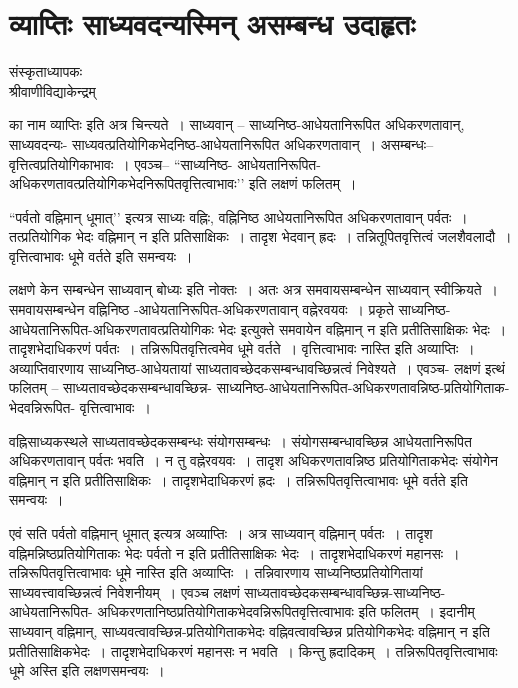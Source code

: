 {\fontsize{15}{17}\selectfont
\chapter{व्याप्तिः साध्यवदन्यस्मिन्  असम्बन्ध उदाहृतः}

\begin{center}
\smallskip

संस्कृताध्यापकः\\
श्रीवाणीविद्याकेन्द्रम्
\addrule
\end{center}

का नाम व्याप्तिः इति अत्र चिन्त्यते~। साध्यवान् – साध्यनिष्ठ-आधेयतानिरूपित अधिकरणतावान्, साध्यवदन्यः- साध्यवत्प्रतियोगिकभेदनिष्ठ-आधेयतानिरूपित अधिकरणतावान्~। असम्बन्धः--वृत्तित्वप्रतियोगिकाभावः~। एवञ्च– “साध्यनिष्ठ- आधेयतानिरूपित-अधिकरणतावत्प्रतियोगिकभेदनिरूपितवृत्तित्वाभावः’’ इति लक्षणं फलितम्~। 

“पर्वतो वह्निमान् धूमात्’’ इत्यत्र साध्यः वह्निः, वह्निनिष्ठ आधेयतानिरूपित अधिकरणतावान् पर्वतः~। तत्प्रतियोगिक भेदः वह्निमान् न इति प्रतिसाक्षिकः~। तादृश भेदवान् ह्रदः~। तन्नितूपितवृत्तित्वं जलशैवलादौ~। वृत्तित्वाभावः धूमे वर्तते इति समन्वयः~। 

लक्षणे केन सम्बन्धेन साध्यवान् बोध्यः इति नोक्तः~। अतः अत्र समवायसम्बन्धेन साध्यवान् स्वीक्रियते~। समवायसम्बन्धेन वह्निनिष्ठ -आधेयतानिरूपित-अधिकरणतावान् वह्नेरवयवः~। प्रकृते साध्यनिष्ठ-आधेयतानिरूपित-अधिकरणतावत्प्रतियोगिकः भेदः इत्युक्ते समवायेन वह्निमान् न इति प्रतीतिसाक्षिकः भेदः~। तादृशभेदाधिकरणं पर्वतः~। तन्निरूपितवृत्तित्वमेव धूमे वर्तते~। वृत्तित्वाभावः नास्ति इति अव्याप्तिः~। अव्याप्तिवारणाय साध्यनिष्ठ-आधेयतायां साध्यतावच्छेदकसम्बन्धावच्छिन्नत्वं निवेश्यते~। एवञ्च- लक्षणं इत्थं फलितम् – साध्यतावच्छेदकसम्बन्धावच्छिन्न- साध्यनिष्ठ-आधेयतानिरूपित-अधिकरणतावन्निष्ठ-प्रतियोगिताक-भेदवन्निरूपित- वृत्तित्वाभावः~। 

वह्निसाध्यकस्थले साध्यतावच्छेदकसम्बन्धः संयोगसम्बन्धः~। संयोगसम्बन्धावच्छिन्न आधेयतानिरूपित अधिकरणतावान् पर्वतः भवति~। न तु वह्नेरवयवः~। तादृश अधिकरणतावन्निष्ठ प्रतियोगिताकभेदः संयोगेन वह्निमान् न इति प्रतीतिसाक्षिकः~। तादृशभेदाधिकरणं ह्रदः~। तन्निरूपितवृत्तित्वाभावः धूमे वर्तते इति समन्वयः~। 

एवं सति पर्वतो वह्निमान् धूमात् इत्यत्र अव्याप्तिः~। अत्र साध्यवान् वह्निमान् पर्वतः~। तादृश वह्निमन्निष्ठप्रतियोगिताकः भेदः पर्वतो न इति प्रतीतिसाक्षिकः भेदः~। तादृशभेदाधिकरणं महानसः~। तन्निरूपितवृत्तित्वाभावः धूमे नास्ति इति अव्याप्तिः~। तन्निवारणाय साध्यनिष्ठप्रतियोगितायां साध्यवत्त्वावच्छिन्नत्वं निवेशनीयम्~। एवञ्च लक्षणं साध्यतावच्छेदकसम्बन्धा\-वच्छिन्न-साध्यनिष्ठ-आधेयतानिरूपित- अधिकरणतानिष्ठप्रतियोगिताकभेदवन्निरूपितवृत्तित्वाभावः इति फलितम्~। इदानीम् साध्यवान् वह्निमान्, साध्यवत्वावच्छिन्न-प्रतियोगिताकभेदः वह्निवत्वावच्छिन्न प्रतियोगिकभेदः वह्निमान् न इति प्रतीतिसाक्षिकभेदः~। तादृशभेदाधिकरणं महानसः न भवति~। किन्तु ह्रदादिकम्~। तन्निरूपितवृत्तित्वाभावः धूमे अस्ति इति लक्षणसमन्वयः~। 

\articleend
}

